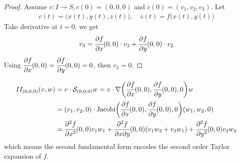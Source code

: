 \documentclass[10pt]{article}
\begin{document}
            \begin{proof}
                Assume $c: I\rightarrow S, c(0) = (0,0,0)$ and $\dot{c}(0) = (v_1,v_2,v_3)$. Let
                \begin{equation*}
                    \begin{aligned}
                        c(t) = \big(x(t),y(t),z(t)\big), \quad z(t) = f\big(x(t), y(t)\big)
                    \end{aligned}
                \end{equation*}
                Take derivative at $t=0$, we get
                \begin{equation*}
                    \begin{aligned}
                        v_3 = \cfrac{\partial f}{\partial x}(0,0)\cdot v_1 + \cfrac{\partial f}{\partial y}(0,0)\cdot v_2
                    \end{aligned}
                \end{equation*}
                Using $\cfrac{\partial f}{\partial x}(0,0) = \cfrac{\partial f}{\partial y}(0,0) = 0$, then $v_3 = 0$.
            \end{proof}
            \begin{remark}\label{Remark: the remark of proposition 8}
                \begin{equation*}
                    \begin{aligned}
                        II_{(0,0,0)}(v,w) &= v\cdot\mathcal{S}_{(0,0,0)}w = v\cdot\nabla\bigg(\cfrac{\partial f}{\partial x}(0,0), \cfrac{\partial f}{\partial y}(0,0),0\bigg)w \\
                        &= (v_1, v_2, 0)\cdot\text{Jacobi}\bigg(\cfrac{\partial f}{\partial x}(0,0), \cfrac{\partial f}{\partial y}(0,0),0\bigg)(w_1, w_2, 0) \\
                        &= \cfrac{\partial^2f}{\partial x^2}(0,0)v_1w_1 + \cfrac{\partial^2 f}{\partial x\partial y}(0,0)(v_1w_2+v_2w_1) + \cfrac{\partial^2 f}{\partial y^2}(0,0)v_2w_2
                    \end{aligned}
                \end{equation*}
                which means the second fundamental form encodes the second order Taylor expansion of $f$.
            \end{remark}
\end{document}
